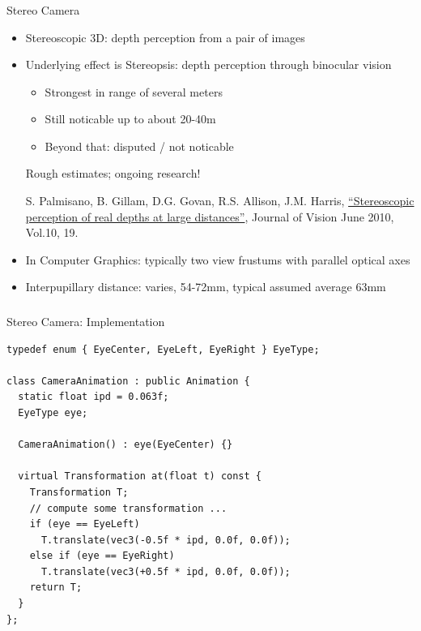 \documentclass[utf8,stillsansserifmath,fleqn,t]{beamer}
\newcommand{\literature}[1]{{\tiny #1 \par}}
\begin{document}
\begin{frame}[label=stereo-3d]
\frametitle{\insertsection}
Stereo Camera
\begin{itemize}
\item Stereoscopic 3D: depth perception from a pair of images
\item Underlying effect is Stereopsis: depth perception through binocular vision
    \begin{itemize}
    \item Strongest in range of several meters
    \item Still noticable up to about 20-40m
    \item Beyond that: disputed / not noticable
    \end{itemize}
    Rough estimates; ongoing research! \literature{S. Palmisano, B. Gillam, D.G.
    Govan, R.S. Allison, J.M. Harris, \href{https://doi.org/10.1167/10.6.19}{``Stereoscopic perception of real
    depths at large distances''}, Journal of Vision June 2010, Vol.10, 19.}
\item In Computer Graphics: typically two view frustums with parallel optical axes
\item Interpupillary distance: varies, 54-72mm, typical assumed average 63mm
\end{itemize}
\end{frame}

\begin{frame}[fragile]
\frametitle{\insertsection}
Stereo Camera: Implementation
\begin{lstlisting}
typedef enum { EyeCenter, EyeLeft, EyeRight } EyeType;

class CameraAnimation : public Animation {
  static float ipd = 0.063f;
  EyeType eye;

  CameraAnimation() : eye(EyeCenter) {}

  virtual Transformation at(float t) const {
    Transformation T;
    // compute some transformation ...
    if (eye == EyeLeft)
      T.translate(vec3(-0.5f * ipd, 0.0f, 0.0f));
    else if (eye == EyeRight)
      T.translate(vec3(+0.5f * ipd, 0.0f, 0.0f));
    return T;
  }
};
\end{lstlisting}
\end{frame}
\end{document}
